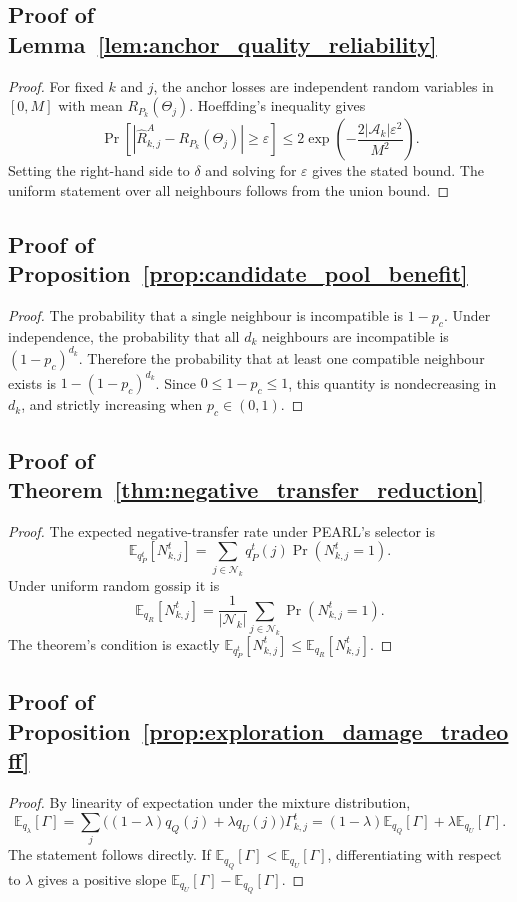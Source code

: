 \documentclass[conference]{IEEEtran}
\begin{document}
\subsection{Proof of Lemma~\ref{lem:anchor_quality_reliability}}
\begin{proof}
For fixed \(k\) and \(j\), the anchor losses are independent random variables in \([0,M]\) with mean \(R_{P_k}(\Theta_j)\). Hoeffding's inequality gives
\[
\Pr\!\left[
\left|
\widehat{R}_{k,j}^{A}
-
R_{P_k}(\Theta_j)
\right|
\geq \varepsilon
\right]
\leq
2\exp\!\left(
-\frac{2|\mathcal{A}_k|\varepsilon^2}{M^2}
\right).
\]
Setting the right-hand side to \(\delta\) and solving for \(\varepsilon\) gives the stated bound. The uniform statement over all neighbours follows from the union bound.
\end{proof}

\subsection{Proof of Proposition~\ref{prop:candidate_pool_benefit}}
\begin{proof}
The probability that a single neighbour is incompatible is \(1-p_c\). Under independence, the probability that all \(d_k\) neighbours are incompatible is \((1-p_c)^{d_k}\). Therefore the probability that at least one compatible neighbour exists is \(1-(1-p_c)^{d_k}\). Since \(0\leq 1-p_c\leq1\), this quantity is nondecreasing in \(d_k\), and strictly increasing when \(p_c\in(0,1)\).
\end{proof}

\subsection{Proof of Theorem~\ref{thm:negative_transfer_reduction}}
\begin{proof}
The expected negative-transfer rate under PEARL's selector is
\[
\mathbb{E}_{q_P^t}[N_{k,j}^t]
=
\sum_{j\in\mathcal{N}_k}
q_P^t(j)\Pr(N_{k,j}^t=1).
\]
Under uniform random gossip it is
\[
\mathbb{E}_{q_R}[N_{k,j}^t]
=
\frac{1}{|\mathcal{N}_k|}
\sum_{j\in\mathcal{N}_k}
\Pr(N_{k,j}^t=1).
\]
The theorem's condition is exactly \(\mathbb{E}_{q_P^t}[N_{k,j}^t]\leq\mathbb{E}_{q_R}[N_{k,j}^t]\).
\end{proof}

\subsection{Proof of Proposition~\ref{prop:exploration_damage_tradeoff}}
\begin{proof}
By linearity of expectation under the mixture distribution,
\[
\mathbb{E}_{q_\lambda}[\Gamma]
=
\sum_j\big((1-\lambda)q_Q(j)+\lambda q_U(j)\big)\Gamma_{k,j}^t
=
(1-\lambda)\mathbb{E}_{q_Q}[\Gamma]
+
\lambda\mathbb{E}_{q_U}[\Gamma].
\]
The statement follows directly. If \(\mathbb{E}_{q_Q}[\Gamma]<\mathbb{E}_{q_U}[\Gamma]\), differentiating with respect to \(\lambda\) gives a positive slope \(\mathbb{E}_{q_U}[\Gamma]-\mathbb{E}_{q_Q}[\Gamma]\).
\end{proof}
\end{document}
